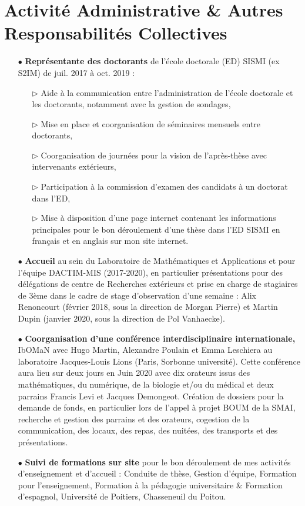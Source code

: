 \documentclass[a4paper, 12pt, twoside, openright]{article}
\begin{document}
\section{Activité Administrative \& Autres Responsabilités Collectives}
\begin{itemize}
\item[\color{MagSombre}$\bullet$] \textbf{\color{MagSombre}Représentante des doctorants} de l'école doctorale (ED) SISMI (ex S2IM) de juil. 2017 à oct. 2019 :
\begin{itemize}
\item[$\triangleright$] Aide à la communication entre l'administration de l'école doctorale et les doctorants, notamment avec la gestion de sondages,
\item[$\triangleright$] Mise en place et coorganisation de séminaires mensuels entre doctorants,
\item[$\triangleright$] Coorganisation de journées pour la vision de l'après-thèse avec intervenants extérieurs,
\item[$\triangleright$] Participation à la commission d'examen des candidats à un doctorat dans l'ED,
\item[$\triangleright$] Mise à disposition d'une page internet contenant les informations principales pour le bon déroulement d'une thèse dans l'ED SISMI en français et en anglais sur mon site internet.
\end{itemize}
\item[\color{MagSombre}$\bullet$] \textbf{\color{MagSombre}Accueil} au sein du Laboratoire de Mathématiques et Applications et pour l'équipe DACTIM-MIS (2017-2020), en particulier présentations pour des délégations de centre de Recherches extérieurs et prise en charge de stagiaires de 3ème dans le cadre de stage d'observation d'une semaine : Alix Renoncourt (février 2018, sous la direction de Morgan Pierre) et Martin Dupin (janvier 2020, sous la direction de Pol Vanhaecke).
\item[\color{MagSombre}$\bullet$] \textbf{\color{MagSombre}Coorganisation d'une conférence interdisciplinaire internationale,} IbOMaN avec Hugo Martin, Alexandre Poulain et Emma Leschiera au laboratoire Jacques-Louis Lions (Paris, Sorbonne université). Cette conférence aura lieu sur deux jours en Juin 2020 avec dix orateurs issus des mathématiques, du numérique, de la biologie et/ou du médical et deux parrains Francis Levi et Jacques Demongeot. Création de dossiers pour la demande de fonds, en particulier lors de l'appel à projet BOUM de la SMAI, recherche et gestion des parrains et des orateurs, cogestion de la communication, des locaux, des repas, des nuitées, des transports et des présentations.
\item[\color{MagSombre}$\bullet$] \textbf{\color{MagSombre}Suivi de formations sur site} pour le bon déroulement de mes activités d'enseignement et d'accueil : Conduite de thèse, Gestion d'équipe, Formation pour l'enseignement, Formation à la pédagogie universitaire \& Formation d'espagnol, Université de Poitiers, Chasseneuil du Poitou.
\end{itemize}
\end{document}
